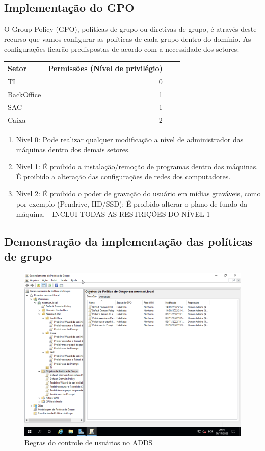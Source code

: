 \documentclass[12pt]{article}
\begin{document}
\subsection{Implementação do GPO}
O Group Policy (GPO), políticas de grupo ou diretivas de grupo, é através deste recurso que vamos configurar as políticas de cada grupo dentro do domínio. As configurações ficarão predispostas de acordo com a necessidade dos setores:
\begin{center}
\begin{tabular}{| l | r | r | r |}
\hline
Setor & Permissões (Nível de privilégio)\\
\hline
TI & 0\\
BackOffice & 1\\
SAC & 1\\
Caixa & 2\\ 
\hline
\end{tabular}
\end{center}
\begin{enumerate}
    \item Nível 0: Pode realizar qualquer modificação a nível de administrador das máquinas dentro dos demais setores.
    \item Nível 1: É proibido a instalação/remoção de programas dentro das máquinas. É proibido a alteração das configurações de redes dos computadores.
    \item Nível 2: É proibido o poder de gravação do usuário em mídias graváveis, como por exemplo (Pendrive, HD/SSD); É proibido alterar o plano de fundo da máquina. - INCLUI TODAS AS RESTRIÇÕES DO NÍVEL 1
\end{enumerate}
\subsection{Demonstração da implementação das políticas de grupo}
\begin{figure}[ht]
\centering
\includegraphics[height=0.5\textwidth]{adds-regras.png}
\caption{Regras do controle de usuários no ADDS}
\label{fig:adds-pastas}
\end{figure}
\end{document}
